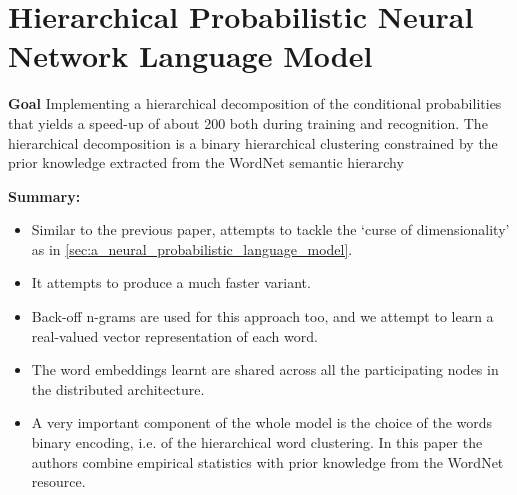 \documentclass[11pt,a4paper]{article}
\begin{document}


\section{Hierarchical Probabilistic Neural Network Language Model} %
\label{sec:hierarchical_probabilistic_neural_network_language_model}

  \textbf{Goal}
  Implementing a  hierarchical decomposition of the conditional probabilities that yields a speed-up of about 200 both during training and recognition. The hierarchical decomposition is a binary hierarchical clustering constrained by the prior knowledge extracted from the WordNet semantic hierarchy

  \textbf{Summary:}
  \begin{itemize}
    \item 
    Similar to the previous paper, attempts to tackle the `curse of dimensionality' as in \ref{sec:a_neural_probabilistic_language_model}. 
    \item 
    It attempts to produce a much faster variant.
    \item 
    Back-off n-grams are used for this approach too, and we attempt to learn a real-valued vector representation of each word.
    \item 
    The word embeddings learnt are shared across all the participating nodes in the distributed architecture.
    \item 
    A very important component of the whole model is the choice of the words binary encoding, i.e. of the hierarchical word clustering. In this paper the authors combine empirical statistics with prior knowledge from the WordNet resource.
  \end{itemize}



\newpage



\end{document}
